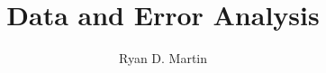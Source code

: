 \documentclass[11pt]{report}
\begin{document}
\title{Data and Error Analysis}
\author{Ryan D. Martin}
\maketitle
\tableofcontents
{}

%







%
%
%
\end{document}

